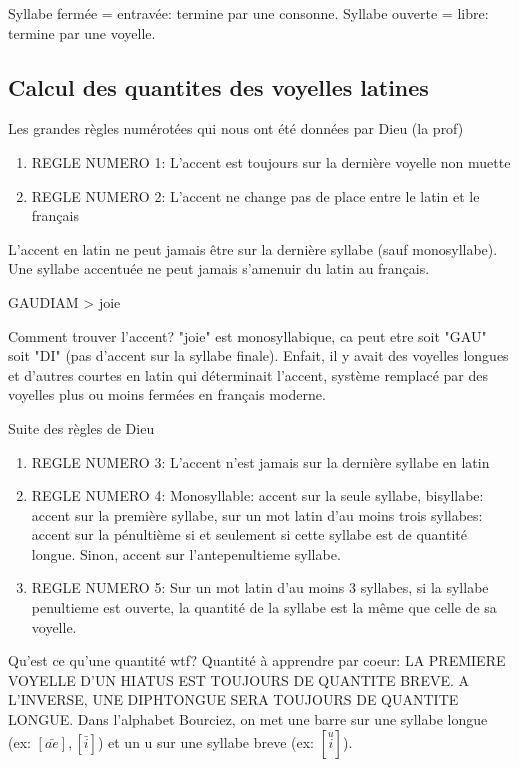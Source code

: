 \documentclass[a4paper]{report}
\theoremstyle{definition}
\theoremstyle{remark}
\begin{document}
Syllabe fermée = entravée: termine par une consonne. Syllabe ouverte = libre: termine par une voyelle.

\subsection{Calcul des quantites des voyelles latines}

Les grandes règles numérotées qui nous ont été données par Dieu (la prof)

\begin{enumerate}
    \item REGLE NUMERO 1: L'accent est toujours sur la dernière voyelle non muette
    \item REGLE NUMERO 2: L'accent ne change pas de place entre le latin et le français
\end{enumerate} \par

L'accent en latin ne peut jamais être sur la dernière syllabe (sauf monosyllabe). Une syllabe accentuée ne peut jamais s'amenuir du latin au français. \par

GAUDIAM > joie \par

Comment trouver l'accent? "joie" est monosyllabique, ca peut etre soit "GAU" soit "DI" (pas d'accent sur la syllabe finale). Enfait, il y avait des voyelles longues et d'autres courtes en latin qui déterminait l'accent, système remplacé par des voyelles plus ou moins fermées en français moderne.

Suite des règles de Dieu
\begin{enumerate}
    \item REGLE NUMERO 3: L'accent n'est jamais sur la dernière syllabe en latin
    \item REGLE NUMERO 4: Monosyllable: accent sur la seule syllabe, bisyllabe: accent sur la première syllabe, sur un mot latin d'au moins trois syllabes: accent sur la pénultième si et seulement si cette syllabe est de quantité longue. Sinon, accent sur l'antepenultieme syllabe.
    \item REGLE NUMERO 5: Sur un mot latin d'au moins 3 syllabes, si la syllabe penultieme est ouverte, la quantité de la syllabe est la même que celle de sa voyelle.
\end{enumerate}

Qu'est ce qu'une quantité wtf? Quantité à apprendre par coeur: LA PREMIERE VOYELLE D'UN HIATUS EST TOUJOURS DE QUANTITE BREVE. A L'INVERSE, UNE DIPHTONGUE SERA TOUJOURS DE QUANTITE LONGUE. Dans l'alphabet Bourciez, on met une barre sur une syllabe longue (ex: $[\bar{ae}], [\bar{i}]$) et un u sur une syllabe breve (ex: $[\overset{u}{i}]$). \par
\end{document}
